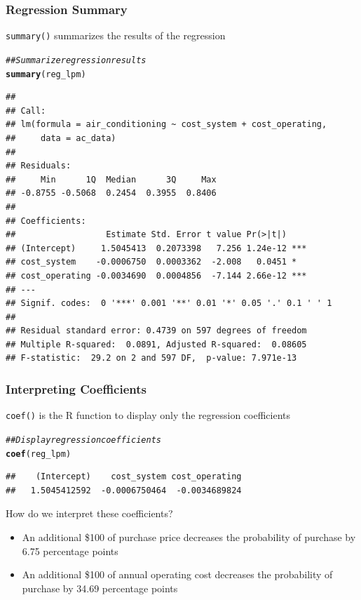 \documentclass{beamer}\usepackage[]{graphicx}\usepackage[]{xcolor}
\makeatletter
\newcommand{\hlcom}[1]{\textcolor[rgb]{0.678,0.584,0.686}{\textit{#1}}}%
\newcommand{\hlstd}[1]{\textcolor[rgb]{0.345,0.345,0.345}{#1}}%
\newcommand{\hlkwd}[1]{\textcolor[rgb]{0.737,0.353,0.396}{\textbf{#1}}}%
\newenvironment{kframe}{%
 \def\at@end@of@kframe{}%
 \ifinner\ifhmode%
  \def\at@end@of@kframe{\end{minipage}}%
  \begin{minipage}{\columnwidth}%
 \fi\fi%
 \def\FrameCommand##1{\hskip\@totalleftmargin \hskip-\fboxsep
 \colorbox{shadecolor}{##1}\hskip-\fboxsep
     \hskip-\linewidth \hskip-\@totalleftmargin \hskip\columnwidth}%
 \MakeFramed {\advance\hsize-\width
   \@totalleftmargin\z@ \linewidth\hsize
   \@setminipage}}%
 {\par\unskip\endMakeFramed%
 \at@end@of@kframe}
\newenvironment{knitrout}{}{} %
\makeatother
\begin{document}
\begin{frame}[fragile]\frametitle{Regression Summary}
    \texttt{summary()} summarizes the results of the regression
    \vspace{1ex}
\begin{knitrout}\scriptsize
{}\color{fgcolor}\begin{kframe}
\begin{alltt}
\hlcom{## Summarize regression results}
\hlkwd{summary}\hlstd{(reg_lpm)}
\end{alltt}
\begin{verbatim}
## 
## Call:
## lm(formula = air_conditioning ~ cost_system + cost_operating, 
##     data = ac_data)
## 
## Residuals:
##     Min      1Q  Median      3Q     Max 
## -0.8755 -0.5068  0.2454  0.3955  0.8406 
## 
## Coefficients:
##                  Estimate Std. Error t value Pr(>|t|)    
## (Intercept)     1.5045413  0.2073398   7.256 1.24e-12 ***
## cost_system    -0.0006750  0.0003362  -2.008   0.0451 *  
## cost_operating -0.0034690  0.0004856  -7.144 2.66e-12 ***
## ---
## Signif. codes:  0 '***' 0.001 '**' 0.01 '*' 0.05 '.' 0.1 ' ' 1
## 
## Residual standard error: 0.4739 on 597 degrees of freedom
## Multiple R-squared:  0.0891,	Adjusted R-squared:  0.08605 
## F-statistic:  29.2 on 2 and 597 DF,  p-value: 7.971e-13
\end{verbatim}
\end{kframe}
\end{knitrout}
\end{frame}

\begin{frame}[fragile]\frametitle{Interpreting Coefficients}
    \texttt{coef()} is the R function to display only the regression coefficients
\begin{knitrout}\footnotesize
{}\color{fgcolor}\begin{kframe}
\begin{alltt}
\hlcom{## Display regression coefficients}
\hlkwd{coef}\hlstd{(reg_lpm)}
\end{alltt}
\begin{verbatim}
##    (Intercept)    cost_system cost_operating 
##   1.5045412592  -0.0006750464  -0.0034689824
\end{verbatim}
\end{kframe}
\end{knitrout}
    \vspace{2ex}
    How do we interpret these coefficients?
    \begin{itemize}
        \item An additional \$100 of purchase price decreases the probability of purchase by 6.75 percentage points
        \item An additional \$100 of annual operating cost decreases the probability of purchase by 34.69 percentage points
    \end{itemize}
\end{frame}
\end{document}
